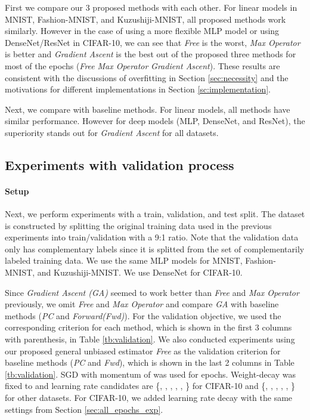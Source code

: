 \documentclass{article}
\begin{document}
First we compare our 3 proposed methods with each other.
For linear models in MNIST, Fashion-MNIST, and Kuzushiji-MNIST, all proposed methods work similarly.
However in the case of using a more flexible MLP model or using DenseNet/ResNet in CIFAR-10, we can see that \emph{Free} is the worst, \emph{Max Operator} is better and \emph{Gradient Ascent} is the best out of the proposed three methods for most of the epochs (\emph{Free}  \emph{Max Operator}  \emph{Gradient Ascent}).
These results are consistent with the discussions of overfitting in Section \ref{sec:necessity} and the motivations for different implementations in Section \ref{sc:implementation}.

Next, we compare with baseline methods.
For linear models, all methods have similar performance.
However for deep models (MLP, DenseNet, and ResNet), the superiority stands out for \emph{Gradient Ascent} for all datasets.

\subsection{Experiments with validation process}
\label{sec:validation_experiments}
\paragraph{Setup}
Next, we perform experiments with a train, validation, and test split.  The dataset is constructed by splitting the original training data used in the previous experiments into train/validation with a 9:1 ratio.  Note that the validation data only has complementary labels since it is splitted from the set of complementarily labeled training data.
We use the same MLP models for MNIST, Fashion-MNIST, and Kuzushiji-MNIST.
We use DenseNet for CIFAR-10.

Since \emph{Gradient Ascent (GA)} seemed to work better than \emph{Free} and \emph{Max Operator} previously, we omit \emph{Free} and \emph{Max Operator} and compare \emph{GA} with baseline methods (\emph{PC} and \emph{Forward(Fwd)}).
For the validation objective, we used the corresponding criterion for each method, which is shown in the first 3 columns with parenthesis, in Table \ref{tb:validation}.
We also conducted experiments using our proposed general unbiased estimator \emph{Free} as the validation criterion for baseline methods (\emph{PC} and \emph{Fwd}), which is shown in the last 2 columns in Table \ref{tb:validation}.
SGD with momentum of  was used for  epochs.
Weight-decay was fixed to  and learning rate candidates are \{, , , , , \} for CIFAR-10 and \{, , , , , \} for other datasets.
For CIFAR-10, we added learning rate decay with the same settings from Section \ref{sec:all_epochs_exp}.
\end{document}
